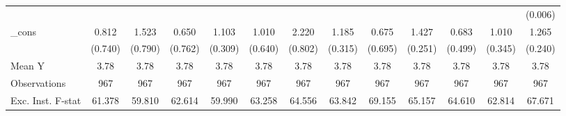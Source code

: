 {\begin{tabular}{l*{12}{c}}
            &                     &                     &                     &                     &                     &                     &                     &                     &                     &                     &                     &     (0.006)         \\
\addlinespace
\_cons      &       0.812         &       1.523\sym{*}  &       0.650         &       1.103\sym{***}&       1.010         &       2.220\sym{***}&       1.185\sym{***}&       0.675         &       1.427\sym{***}&       0.683         &       1.010\sym{***}&       1.265\sym{***}\\
            &     (0.740)         &     (0.790)         &     (0.762)         &     (0.309)         &     (0.640)         &     (0.802)         &     (0.315)         &     (0.695)         &     (0.251)         &     (0.499)         &     (0.345)         &     (0.240)         \\
\midrule
Mean Y      &        3.78         &        3.78         &        3.78         &        3.78         &        3.78         &        3.78         &        3.78         &        3.78         &        3.78         &        3.78         &        3.78         &        3.78         \\
Observations&         967         &         967         &         967         &         967         &         967         &         967         &         967         &         967         &         967         &         967         &         967         &         967         \\
Exc. Inst. F-stat&      61.378         &      59.810         &      62.614         &      59.990         &      63.258         &      64.556         &      63.842         &      69.155         &      65.157         &      64.610         &      62.814         &      67.671         \\
\bottomrule
\end{tabular}
}
